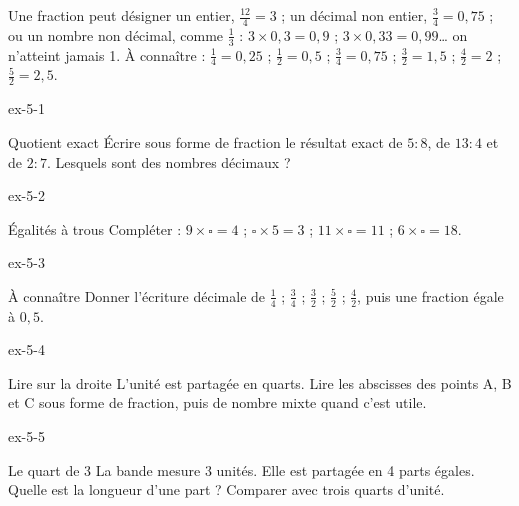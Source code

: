 \begin{propriete}Une fraction peut désigner un entier, $\frac{12}4=3$ ; un décimal non entier, $\frac34=0{,}75$ ; ou un nombre non décimal, comme $\frac13$ : $3\times0{,}3=0{,}9$ ; $3\times0{,}33=0{,}99$… on n’atteint jamais 1. À connaître : $\frac14=0{,}25$ ; $\frac12=0{,}5$ ; $\frac34=0{,}75$ ; $\frac32=1{,}5$ ; $\frac42=2$ ; $\frac52=2{,}5$.\end{propriete}

\clearpage{}
\begin{blocLivre}{ex-5-1}\begin{exercice}[1]{Quotient exact}
Écrire sous forme de fraction le résultat exact de $5:8$, de $13:4$ et de $2:7$. Lesquels sont des nombres décimaux ?
\end{exercice}\end{blocLivre}
\begin{blocLivre}{ex-5-2}\begin{exercice}[1]{Égalités à trous}
Compléter : $9\times\square=4$ ; $\square\times5=3$ ; $11\times\square=11$ ; $6\times\square=18$.
\end{exercice}\end{blocLivre}
\begin{blocLivre}{ex-5-3}\begin{exercice}[1]{À connaître}
Donner l’écriture décimale de $\frac14$ ; $\frac34$ ; $\frac32$ ; $\frac52$ ; $\frac42$, puis une fraction égale à $0{,}5$.
\end{exercice}\end{blocLivre}
\begin{blocLivre}{ex-5-4}\begin{exercice}[1]{Lire sur la droite}
L’unité est partagée en quarts. Lire les abscisses des points A, B et C sous forme de fraction, puis de nombre mixte quand c’est utile.
\label{fig-ex-5-4}
\end{exercice}\end{blocLivre}
\begin{blocLivre}{ex-5-5}\begin{exercice}[1]{Le quart de 3}
La bande mesure 3 unités. Elle est partagée en 4 parts égales. Quelle est la longueur d’une part ? Comparer avec trois quarts d’unité.
\label{fig-ex-5-5}
\end{exercice}\end{blocLivre}

